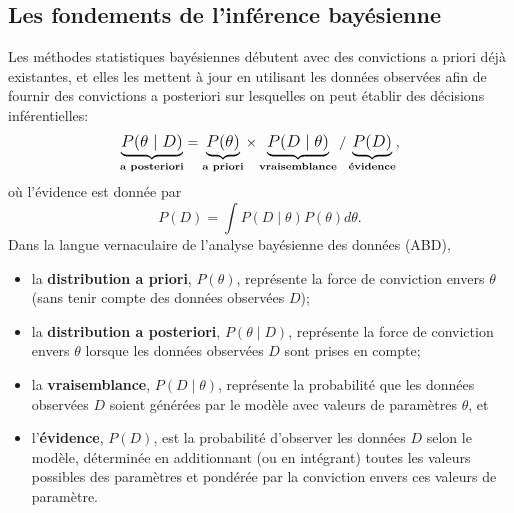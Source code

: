 \subsection{Les fondements de l'inférence bayésienne} 
Les méthodes statistiques bayésiennes d\'ebutent avec des convictions a priori d\'ej\`a existantes, et elles les mettent à jour en utilisant les données observ\'ees afin de fournir des convictions a posteriori sur lesquelles on peut \'etablir des décisions inférentielles:
$$ \large \underbrace{P(\theta \mid  D)}_{\textbf{a posteriori}} = \underbrace{P(\theta)}_{\textbf{a priori}} \times  \underbrace{P(D\mid \theta)}_{\textbf{vraisemblance}} /\underbrace{P(D)}_{\textbf{évidence}}, $$
où l'évidence est donn\'ee par 
$$ P(D) = \int P(D\mid \theta) P(\theta) d\theta.$$
Dans la langue vernaculaire de l'analyse bayésienne des données (ABD),
\begin{itemize}[noitemsep]
\item la \textbf{distribution a priori}, $P(\theta)$, représente la force de conviction envers $\theta$ (sans tenir compte des données observées $D$);
\item la \textbf{distribution a posteriori}, $P(\theta \mid  D)$, représente la force de conviction envers $\theta$ lorsque les données observées $D$ sont prises en compte; 
\item la \textbf{vraisemblance}, $P(D\mid \theta)$, repr\'esente la probabilité que les données observées $D$ soient générées par le modèle avec valeurs de paramètres $\theta$, et
\item l'\textbf{évidence}, $P(D)$, est la probabilité d'observer les données $D$ selon le modèle, déterminée en additionnant (ou en intégrant) toutes les valeurs possibles des paramètres et pondérée par la conviction envers ces valeurs de paramètre.
\end{itemize}
